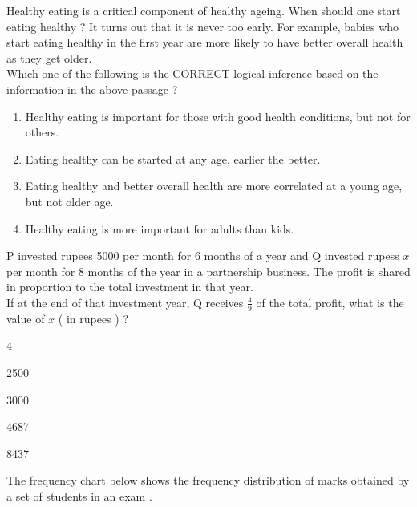 	\item Healthy eating is a critical component of healthy ageing. When should one start eating healthy ? It turns out that it is never too early. For example, babies who start eating healthy in the first year are more likely to have better overall health as they get older. \\
		Which one of the following is the CORRECT logical inference based on the information in the above passage ?
		\begin{enumerate}
			\item Healthy eating is important for those with good health conditions, but not for others.
			\item Eating healthy can be started at any age, earlier the better.
			\item Eating healthy and better overall health are more correlated at a young age, but not older age.
			\item Healthy eating is more important for adults than kids.
		\end{enumerate}
	\item P invested rupees 5000 per month for 6 months of a year and Q invested rupess $x$ per month for 8 months of the year in a partnership business. The profit is shared in proportion to the total investment in that year. \\
		If at the end of that investment year, Q receives $\frac{4}{9}$ of the total profit, what is the value of $x$ ( in rupees ) ?
		\begin{enumerate}
		\end{enumerate}
	\item The frequency chart below shows the frequency distribution of marks obtained by a set of students in an exam . \\
		\begin{figure}[H]
			\centering
			\label{tab: Q_8}
		\end{figure}
